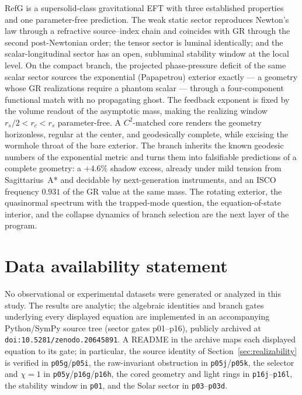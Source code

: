 \documentclass[12pt,a4paper]{article}
\begin{document}
RefG is a supersolid-class gravitational EFT with three established
properties and one parameter-free prediction. The weak static sector reproduces
Newton's law through a refractive source--index chain and coincides with GR
through the second post-Newtonian order; the tensor sector is luminal
identically; and the scalar-longitudinal sector has an open, subluminal stability
window at the local level. On the compact branch, the projected
phase-pressure deficit of the same scalar sector sources the exponential
(Papapetrou) exterior exactly --- a geometry whose GR realizations require a
phantom scalar --- through a four-component functional match with no
propagating ghost. The feedback exponent is fixed by the volume readout of
the asymptotic mass, making the realizing window $r_s/2<r_c<r_s$
parameter-free. A $C^2$-matched core renders the geometry horizonless,
regular at the center, and geodesically complete, while excising the wormhole
throat of the bare exterior. The branch inherits the known geodesic numbers
of the exponential metric and turns them into falsifiable predictions of a
complete geometry: a $+4.6\%$ shadow excess, already under mild tension from
Sagittarius~A* and decidable by next-generation instruments, and an ISCO
frequency $0.931$ of the GR value at the same mass. The rotating exterior, the
quasinormal spectrum with the trapped-mode question, the equation-of-state
interior, and the collapse dynamics of branch selection are the next layer
of the program.

\section*{Data availability statement}

No observational or experimental datasets were generated or analyzed in
this study. The results are analytic; the algebraic identities and branch
gates underlying every displayed equation are implemented in an
accompanying Python/SymPy source tree (sector gates p01--p16), publicly
archived at \texttt{doi:10.5281/zenodo.20645891}. A README in the archive
maps each displayed equation to its gate; in particular, the source identity
of Section~\ref{sec:realizability} is verified in
\texttt{p05g}/\texttt{p05i}, the raw-invariant obstruction in
\texttt{p05j}/\texttt{p05k}, the selector and $\chi=1$ in
\texttt{p05y}/\texttt{p16g}/\texttt{p16h}, the cored geometry and light
rings in \texttt{p16j}--\texttt{p16l}, the stability window in
\texttt{p01}, and the Solar sector in \texttt{p03}--\texttt{p03d}.
\end{document}
